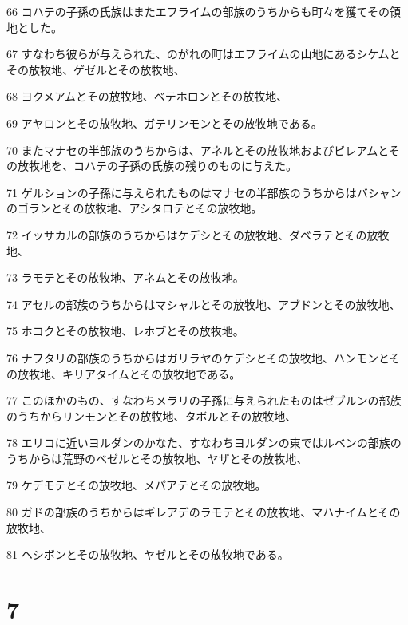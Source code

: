 \par 66 コハテの子孫の氏族はまたエフライムの部族のうちからも町々を獲てその領地とした。
\par 67 すなわち彼らが与えられた、のがれの町はエフライムの山地にあるシケムとその放牧地、ゲゼルとその放牧地、
\par 68 ヨクメアムとその放牧地、ベテホロンとその放牧地、
\par 69 アヤロンとその放牧地、ガテリンモンとその放牧地である。
\par 70 またマナセの半部族のうちからは、アネルとその放牧地およびビレアムとその放牧地を、コハテの子孫の氏族の残りのものに与えた。
\par 71 ゲルションの子孫に与えられたものはマナセの半部族のうちからはバシャンのゴランとその放牧地、アシタロテとその放牧地。
\par 72 イッサカルの部族のうちからはケデシとその放牧地、ダベラテとその放牧地、
\par 73 ラモテとその放牧地、アネムとその放牧地。
\par 74 アセルの部族のうちからはマシャルとその放牧地、アブドンとその放牧地、
\par 75 ホコクとその放牧地、レホブとその放牧地。
\par 76 ナフタリの部族のうちからはガリラヤのケデシとその放牧地、ハンモンとその放牧地、キリアタイムとその放牧地である。
\par 77 このほかのもの、すなわちメラリの子孫に与えられたものはゼブルンの部族のうちからリンモンとその放牧地、タボルとその放牧地、
\par 78 エリコに近いヨルダンのかなた、すなわちヨルダンの東ではルベンの部族のうちからは荒野のベゼルとその放牧地、ヤザとその放牧地、
\par 79 ケデモテとその放牧地、メパアテとその放牧地。
\par 80 ガドの部族のうちからはギレアデのラモテとその放牧地、マハナイムとその放牧地、
\par 81 ヘシボンとその放牧地、ヤゼルとその放牧地である。

\chapter{7}


